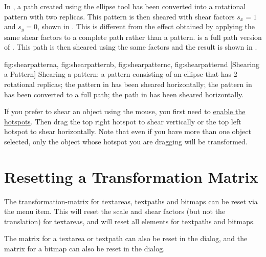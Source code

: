 In , a \gls*{path} created using the
ellipse tool has been converted into a rotational pattern with two
replicas. This pattern is then sheared with shear factors $s_x=1$
and $s_y=0$, shown in . This is
different from the effect obtained by applying the same shear
factors to a complete path rather than a pattern.
 is a full path version of
. This path is then sheared using the
same factors and the result is shown in
.

{
 {fig:shearpatterna}{}{},
 {fig:shearpatternb}{}{},
 {fig:shearpatternc}{}{},
 {fig:shearpatternd}{}{}
}
[Shearing a Pattern]
{Shearing a pattern: 
 a pattern consisting of an
ellipse that has 2 rotational replicas; 
 the pattern 
in  has been sheared horizontally;
 the pattern 
in  has been converted to a full path; 
 the path 
in  has been sheared horizontally.}

If you prefer to shear an \gls{object} using the mouse,
you first need to \hyperref[mi:hotspots]{enable the hotspots}.
Then drag the top right hotspot to shear vertically
or the top left hotspot to shear horizontally. Note that even if you
have more than one object selected, only the object whose hotspot you
are dragging will be transformed.


\section{Resetting a Transformation Matrix}\label{sec:resetmatrix}


The \gls{transformation-matrix} for \glspl{textarea}, \glspl{textpath}
and \glspl{bitmap} can be reset via the
 menu item. This will reset the scale
and shear factors (but not the translation) for \glspl{textarea},
and will reset all elements for \glspl{textpath} and \glspl{bitmap}.

The matrix for a \gls{textarea} or \gls{textpath} can also be reset
in the  dialog, and the matrix for a \gls{bitmap}
can also be reset in the  dialog.

